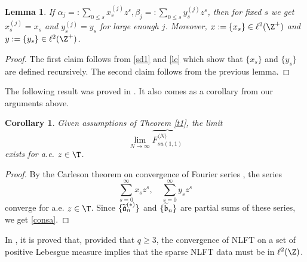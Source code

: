\documentclass[twoside,a4paper]{amsart}
\def\ge{\geqslant}
\def\le{\leqslant}
\newtheorem{corollary}[theorem]{Corollary}
\newtheorem{lemma}[theorem]{Lemma}
\theoremstyle{remark}
\numberwithin{equation}{section}
\begin{document}
\begin{lemma}\label{suv} If $\alpha_j=:\sum_{0\le s}x_s^{(j)}z^s, \beta_j=:\sum_{0\le s}y_s^{(j)}z^s$, then for fixed $s$ we get $x_s^{(j)}=x_s$ and $y_s^{(j)}=y_s$ for large enough $j$. Moreover, $x:=\{x_s\}\in \ell^2(\Z^+)$ and $y:=\{y_s\}\in \ell^2(\Z^+)$.
\end{lemma}
\begin{proof}The first claim follows from   \eqref{sd1} and \eqref{le} which show that $\{x_s\}$ and $\{y_s\}$ are defined recursively. The second  claim follows  from the previous lemma.
\end{proof}

The following result was proved in \cite{Jelena}. It also comes as a corollary from our arguments above.

\begin{corollary} \label{c0}Given assumptions of Theorem \ref{t1}, the limit
 \begin{equation}\lim_{N\to\infty}\overbrace{F_{su(1,1)}^{\langle N\rangle}}\label{consa}
 \end{equation}
 exists for a.e. $z\in \T$.
\end{corollary}
\begin{proof}
 By the Carleson theorem on convergence of Fourier series \cite{carles}, the series
\[
\sum_{s=0}^\infty x_sz^s, \quad \sum_{s=0}^\infty y_sz^s
\]
converge for a.e. $z\in \T$. Since $\{\widetilde{\frak{a}}^{(*)}_n\}$ and $\{\widetilde{\frak{b}}_n\}$ are partial sums of these series, we get \eqref{consa}.
\end{proof}
 In \cite{Jelena}, it is proved that, provided that $q\ge 3$, the convergence of NLFT on a set of positive Lebesgue measure implies that the sparse NLFT data must be in $\ell^2(\Z)$.\medskip
\end{document}
